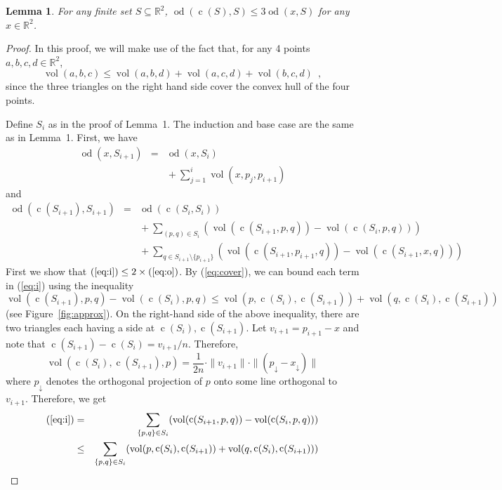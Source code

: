 \documentclass{article}
\newcommand{\R}{\mathbb{R}}
\DeclareMathOperator{\od}{od}
\DeclareMathOperator{\vol}{vol}
\DeclareMathOperator{\cog}{c}
\newcommand{\drop}{\downarrow}
\newtheorem{lem}{Lemma}
\begin{document}
\begin{lem}
For any finite set $S\subseteq\R^2$,
$\od(\cog(S),S) \le 3\od(x,S)$ for any $x\in\R^2$.
\end{lem}

\begin{proof}
In this proof, we will make use of the fact that, for any 4 points
$a,b,c,d\in\R^2$,
\begin{equation}
  \vol(a,b,c) \le \vol(a,b,d) + \vol(a,c,d) + \vol(b,c,d) \enspace , 
   \label{eq:cover}
\end{equation}
since the three triangles on the right hand side cover the convex hull
of the four points.

Define $S_i$ as in the proof of Lemma~1.  The induction and base case are
the same as in Lemma~1.  First, we have
\begin{eqnarray}
\od(x,S_{i+1}) 
   & = & \od(x,S_i) \\
   && {} + \sum_{j=1}^i \vol(x,p_j,p_{i+1}) \label{eq:o}
\end{eqnarray}
and
\begin{eqnarray}
\od(\cog(S_{i+1}),S_{i+1}) 
   & = &\od(\cog(S_{i},S_{i})) \\
   &&    {} + \sum_{(p,q)\in S_i} 
           (\vol(\cog(S_{i+1},p,q))- \vol(\cog(S_{i},p,q)))
              \label{eq:i} \\
   &&   {} + \sum_{q\in S_{i+1}\setminus \{p_{i+1}\}}
           (\vol(\cog(S_{i+1},p_{i+1},q))- \vol(\cog(S_{i+1},x,q))) 
            \label{eq:ii} 
\end{eqnarray}
First we show that $(\ref{eq:i}) \le 2\times (\ref{eq:o})$.
By (\ref{eq:cover}), we can bound each term in (\ref{eq:i}) using the inequality
\[
   \vol(\cog(S_{i+1}),p,q)- \vol(\cog(S_{i}),p,q)
  \le 
   \vol(p,\cog(S_i),\cog(S_{i+1})) + \vol(q,\cog(S_i),\cog(S_{i+1})) 
\]
(see Figure~\ref{fig:approx}). 
On the right-hand side of the above inequality, there are two triangles each having a side at $\cog(S_i),\cog(S_{i+1})$.  Let $v_{i+1}=p_{i+1}-x$ and note that 
$\cog(S_{i+1})-\cog(S_{i}) = v_{i+1}/n$.  Therefore, 
\[
 \vol(\cog(S_{i}),\cog(S_{i+1}),p) = \frac{1}{2n}\cdot\|v_{i+1}\|\cdot\|(p_\drop-x_\drop)\|
\]
where $p_\drop$ denotes the orthogonal projection of $p$ onto some line
orthogonal to $v_{i+1}$.  Therefore, we get
\begin{eqnarray}
(\ref{eq:i}) 
   & = & \sum_{\{p,q\}\in S_i}
            (\vol(\cog(S_{i+1},p,q))- \vol(\cog(S_{i},p,q))) \\
   &\le& \sum_{\{p,q\}\in S_i}
   (\vol(p,\cog(S_i),\cog(S_{i+1})) + \vol(q,\cog(S_i),\cog(S_{i+1})))  \\

\end{eqnarray}
\end{proof}
\end{document}
